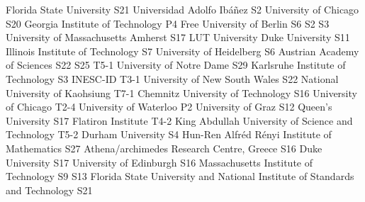 \begin{multicols}{2}
{}
{Florida State University}
{S21}
{}
{}
{}
{}
{}
{}
{Universidad Adolfo Ibáñez}
{S2}
{}
{}
{}
{}
{}
{}
{University of Chicago}
{S20}
{}
{}
{}
{}
{}
{}
{Georgia Institute of Technology}
{P4}
{}
{}
{}
{}
{}
{}
{Free University of Berlin}
{S6}
{S2}
{S3}
{}
{}
{}
{}
{University of Massachusetts Amherst}
{S17}
{}
{}
{}
{}
{}
{}
{LUT University}
{}
{}
{}
{}
{}
{}
{}
{Duke University}
{S11}
{}
{}
{}
{}
{}
{}
{Illinois Institute of Technology}
{S7}
{}
{}
{}
{}
{}
{}
{University of Heidelberg}
{S6}
{}
{}
{}
{}
{}
{}
{Austrian Academy of Sciences}
{S22}
{S25}
{T5-1}
{}
{}
{}
{}
{University of Notre Dame}
{S29}
{}
{}
{}
{}
{}
{}
{Karlsruhe Institute of Technology}
{S3}
{}
{}
{}
{}
{}
{}
{INESC-ID}
{T3-1}
{}
{}
{}
{}
{}
{}
{University of New South Wales}
{S22}
{}
{}
{}
{}
{}
{}
{National University of Kaohsiung}
{T7-1}
{}
{}
{}
{}
{}
{}
{Chemnitz University of Technology}
{S16}
{}
{}
{}
{}
{}
{}
{University of Chicago}
{T2-4}
{}
{}
{}
{}
{}
{}
{University of Waterloo}
{P2}
{}
{}
{}
{}
{}
{}
{University of Graz}
{S12}
{}
{}
{}
{}
{}
{}
{Queen's University}
{S17}
{}
{}
{}
{}
{}
{}
{Flatiron Institute}
{T4-2}
{}
{}
{}
{}
{}
{}
{King Abdullah University of Science and Technology}
{T5-2}
{}
{}
{}
{}
{}
{}
{Durham University}
{S4}
{}
{}
{}
{}
{}
{}
{Hun-Ren Alfréd Rényi Institute of Mathematics}
{S27}
{}
{}
{}
{}
{}
{}
{Athena/archimedes Research Centre, Greece}
{S16}
{}
{}
{}
{}
{}
{}
{Duke University}
{S17}
{}
{}
{}
{}
{}
{}
{University of Edinburgh}
{S16}
{}
{}
{}
{}
{}
{}
{Massachusetts Institute of Technology}
{S9}
{S13}
{}
{}
{}
{}
{}
{Florida State University and National Institute of Standards and Technology}
{S21}
{}
{}
{}
{}
{}
{}

\end{multicols}
